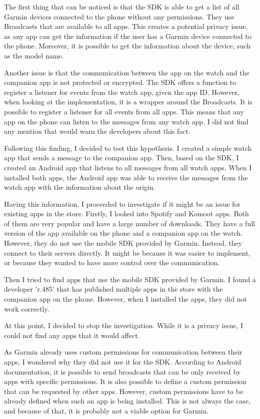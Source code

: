 The first thing that can be noticed is that the SDK is able to get a list of all Garmin devices connected to the phone without any permissions.
They use Broadcasts that are available to all apps.
This creates a potential privacy issue, as any app can get the information if the user has a Garmin device connected to the phone.
Moreover, it is possible to get the information about the device, such as the model name.

Another issue is that the communication between the app on the watch and the companion app is not protected or encrypted.
The SDK offers a function to register a listener for events from the watch app, given the app ID\@.
However, when looking at the implementation, it is a wrapper around the Broadcasts.
It is possible to register a listener for all events from all apps.
This means that any app on the phone can listen to the messages from any watch app.
I did not find any mention that would warn the developers about this fact.

Following this finding, I decided to test this hypothesis.
I created a simple watch app that sends a message to the companion app.
Then, based on the SDK, I created an Android app that listens to all messages from all watch apps.
When I installed both apps, the Android app was able to receive the messages from the watch app with the information about the origin.

Having this information, I proceeded to investigate if it might be an issue for existing apps in the store.
Firstly, I looked into Spotify and Komoot apps.
Both of them are very popular and have a large number of downloads.
They have a full version of the app available on the phone and a companion app on the watch.
However, they do not use the mobile SDK provided by Garmin.
Instead, they connect to their servers directly.
It might be because it was easier to implement, or because they wanted to have more control over the communication.

Then I tried to find apps that use the mobile SDK provided by Garmin.
I found a developer 'r.485' that has published multiple apps in the store with the companion app on the phone.
However, when I installed the apps, they did not work correctly.

At this point, I decided to stop the investigation.
While it is a privacy issue, I could not find any apps that it would affect.


As Garmin already uses custom permissions for communication between their apps, I wondered why they did not use it for the SDK\@.
According to Android documentation,\cite{android-broadcasts} it is possible to send broadcasts that can be only received by apps with specific permissions.
It is also possible to define a custom permission that can be requested by other apps.
However, custom permissions have to be already defined when such an app is being installed.
This is not always the case, and because of that, it is probably not a viable option for Garmin.
